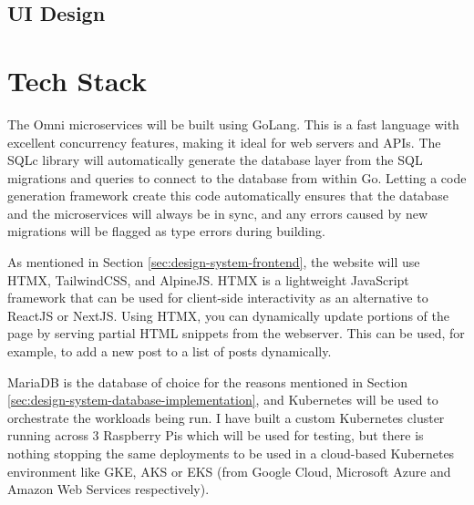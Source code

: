 \subsection{UI Design}
\label{sec:design-ui}

\section{Tech Stack}
\label{sec:design-review}
The Omni microservices will be built using GoLang. This is a fast language with excellent concurrency features, making it ideal for web servers and APIs.
The SQLc library will automatically generate the database layer from the SQL migrations and queries to connect to the database from within Go.
Letting a code generation framework create this code automatically ensures that the database and the microservices will always be in sync, and any errors caused by new migrations will be flagged as type errors during building. 

As mentioned in Section \ref{sec:design-system-frontend}, the website will use HTMX, TailwindCSS, and AlpineJS. HTMX is a lightweight JavaScript framework that can be used for client-side interactivity as an alternative to ReactJS or NextJS.
Using HTMX, you can dynamically update portions of the page by serving partial HTML snippets from the webserver. This can be used, for example, to add a new post to a list of posts dynamically.

MariaDB is the database of choice for the reasons mentioned in Section \ref{sec:design-system-database-implementation}, and Kubernetes will be used to orchestrate the workloads being run. I have built a custom Kubernetes cluster running across 3 Raspberry Pis which will be used for testing, but there is nothing stopping the same deployments to be used in a cloud-based Kubernetes environment like GKE, AKS or EKS (from Google Cloud, Microsoft Azure and Amazon Web Services respectively).
